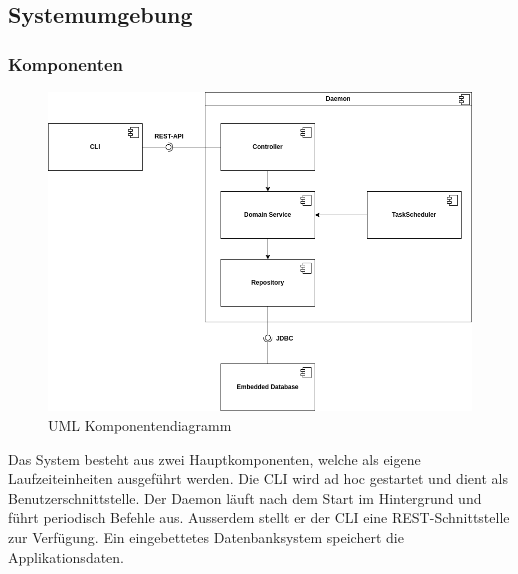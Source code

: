 \documentclass[a4paper,12pt]{report}
\begin{document}
    \subsection{Systemumgebung}

    \subsubsection{Komponenten}


    \begin{figure}[h]
        \centering
        \includegraphics[width=1\textwidth]{assets/comp-diag-aclom}
        \caption{UML Komponentendiagramm}
        \label{fig:comp-diag}
    \end{figure}
    
    \textnormal{Das System besteht aus zwei Hauptkomponenten, welche als eigene Laufzeiteinheiten ausgeführt werden.
    Die CLI wird ad hoc gestartet und dient als Benutzerschnittstelle.
    Der Daemon läuft nach dem Start im Hintergrund und führt periodisch Befehle aus. Ausserdem stellt er der
    CLI eine REST-Schnittstelle zur Verfügung.
    Ein eingebettetes Datenbanksystem speichert die Applikationsdaten.}
\end{document}
